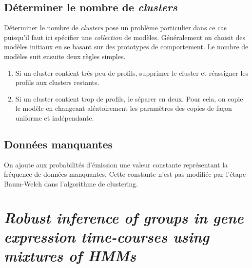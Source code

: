 \documentclass[a4paper, 11pt]{article}
\begin{document}
\subsection{Déterminer le nombre de \textit{clusters}}
Déterminer le nombre de \textit{clusters} pose un problème particulier dans ce cas puisqu'il faut ici spécifier une \textit{collection} de modèles. Généralement on choisit des modèles initiaux en se basant sur des prototypes de comportement. Le nombre de modèles suit ensuite deux règles simples.
\begin{enumerate}
	\item Si un cluster contient très peu de profils, supprimer le cluster et réassigner les profils aux clusters restants. 
	\item Si un cluster contient trop de profils, le séparer en deux. Pour cela, on copie le modèle en changeant aléatoirement les paramètres des copies de façon uniforme et indépendante. 
\end{enumerate}

\subsection{Données manquantes}
On ajoute aux probabilités d'émission une valeur constante représentant la fréquence de données manquantes. Cette constante n'est pas modifiée par l'étape Baum-Welch dans l'algorithme de clustering. 

\section{\textit{Robust inference of groups in gene expression time-courses using mixtures of HMMs}}
\end{document}
